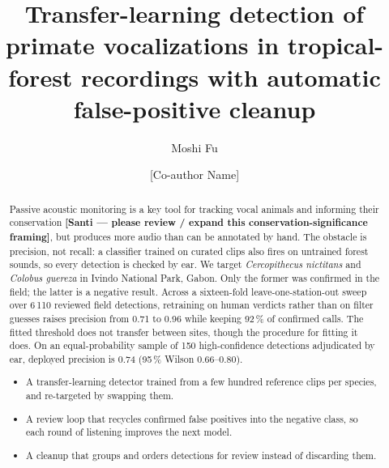 \documentclass[review,3p,times]{elsarticle}
\begin{document}
\begin{frontmatter}

\title{Transfer-learning detection of primate vocalizations in
tropical-forest recordings with automatic false-positive cleanup}

\author[a]{Moshi Fu}

\author[a]{[Co-author Name]}



\begin{abstract}
Passive acoustic monitoring is a key tool for tracking vocal animals and
informing their conservation \textbf{[Santi --- please review / expand this
conservation-significance framing]}, but produces more audio than can be
annotated by hand. The obstacle is precision, not recall: a classifier
trained on curated clips also fires on untrained forest sounds, so every
detection is checked by ear. We target \textit{Cercopithecus
nictitans} and \textit{Colobus guereza} in Ivindo National Park, Gabon. Only the
former was confirmed in the field; the latter is a negative result. Across a sixteen-fold
leave-one-station-out sweep over 6\,110 reviewed field detections,
retraining on human verdicts rather than on filter guesses raises precision from
0.71 to 0.96 while keeping 92\,\% of confirmed calls. The fitted threshold does
not transfer between sites, though the procedure for fitting it does. On an
equal-probability sample of 150 high-confidence detections adjudicated by ear,
deployed precision is 0.74 (95\,\% Wilson 0.66--0.80).

\begin{itemize}
\item A transfer-learning detector trained from a few hundred reference clips
per species, and re-targeted by swapping them.
\item A review loop that recycles confirmed false positives into the negative
class, so each round of listening improves the next model.
\item A cleanup that groups and orders detections for review instead of
discarding them.
\end{itemize}
\end{abstract}


\end{frontmatter}
\end{document}
